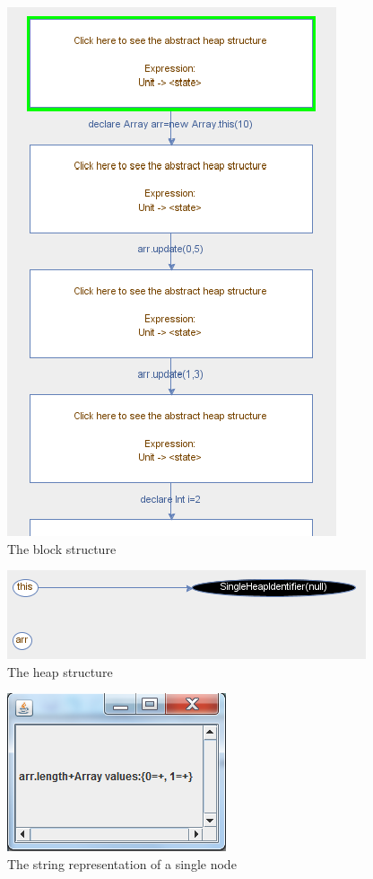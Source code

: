 \documentclass[11pt]{article}
\begin{document}
\begin{figure}
\centering
\includegraphics{block.png}
\caption{The block structure}
\label{fig:block}
\end{figure}

\begin{figure}
\centering
\includegraphics{heap.png}
\caption{The heap structure}
\label{fig:heap}
\end{figure}

\begin{figure}
\centering
\includegraphics{node.png}
\caption{The string representation of a single node}
\label{fig:node}
\end{figure}
\end{document}

